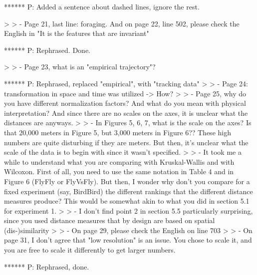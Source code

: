 ****** P: Added a sentence about dashed lines, ignore the rest.

>
> - Page 21, last line: foraging. And on page 22, line 502, please check the English in "It is the features that are invariant"

****** P: Rephrased. Done.

>
> - Page 23, what is an "empirical trajectory"?

****** P: Rephrased, replaced "empirical", with "tracking data" 
>
> - Page 24: transformation in space and time was utilized -> How?
>
> - Page 25, why do you have different normalization factors? And what do you mean with physical interpretation? And since there are no scales on the axes, it is unclear what the distances are anyways.
>
> - In Figures 5, 6, 7, what is the scale on the axes? Is that 20,000 meters in Figure 5, but 3,000 meters in Figure 6?? These high numbers are quite disturbing if they are meters. But then, it's unclear what the scale of the data is to begin with since it wasn't specified.
>
> - It took me a while to understand what you are comparing with Kruskal-Wallis and with Wilcoxon. First of all, you need to use the same notation in Table 4 and in Figure 6 (FlyFly or FlyVsFly). But then, I wonder why don't you compare for a fixed experiment (say, BirdBird) the different rankings that the different distance measures produce? This would be somewhat akin to what you did in section 5.1 for experiment 1.
>
> - I don't find point 2 in section 5.5 particularly surprising, since you used distance measures that by design are based on spatial (dis-)similarity
>
> - On page 29, please check the English on line 703
>
> - On page 31, I don't agree that "low resolution" is an issue. You chose to scale it, and you are free to scale it differently to get larger numbers.

****** P: Rephrased, done.

